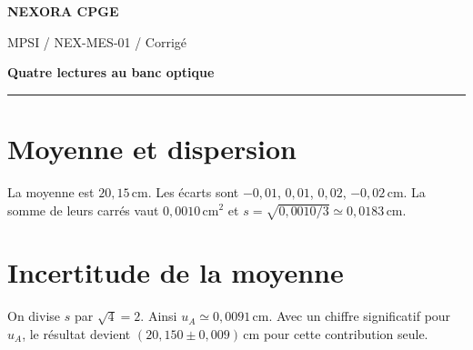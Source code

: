 \documentclass[11pt,a4paper]{article}
\begin{document}
{\small\bfseries\color{nexorablue} NEXORA CPGE}\par
{\small MPSI / NEX-MES-01 / Corrigé}\par
{\LARGE\bfseries Quatre lectures au banc optique}\par
\vspace{0.25em}\hrule\vspace{0.6em}

\section*{Moyenne et dispersion}
La moyenne est $20{,}15\,\mathrm{cm}$. Les écarts sont $-0{,}01$, $0{,}01$, $0{,}02$, $-0{,}02\,\mathrm{cm}$. La somme de leurs carrés vaut $0{,}0010\,\mathrm{cm^2}$ et $s=\sqrt{0{,}0010/3}\simeq0{,}0183\,\mathrm{cm}$.

\section*{Incertitude de la moyenne}
On divise $s$ par $\sqrt4=2$. Ainsi $u_A\simeq0{,}0091\,\mathrm{cm}$. Avec un chiffre significatif pour $u_A$, le résultat devient $(20{,}150\pm0{,}009)\,\mathrm{cm}$ pour cette contribution seule.
\end{document}
